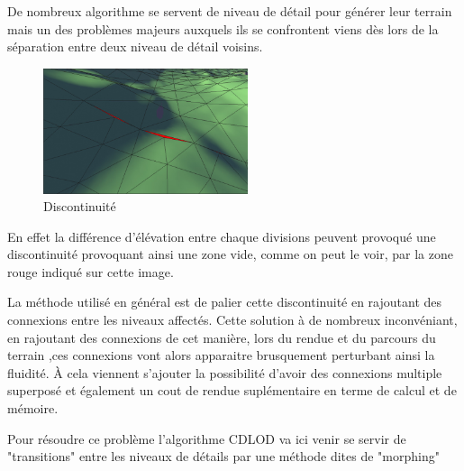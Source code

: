 \documentclass[12pt]{report}
\begin{document}
De nombreux algorithme se servent de niveau de détail pour générer leur terrain mais un des problèmes majeurs auxquels ils se confrontent viens dès lors de la séparation entre deux niveau de détail voisins. 
\begin{figure}
\includegraphics[width=6cm]{img/seams.png}
  \caption{Discontinuité}
  \label{fig:seams}
\end{figure}

\vspace{0.5cm}
En effet la différence d'élévation entre chaque divisions peuvent provoqué une discontinuité provoquant ainsi une zone vide, comme on peut le voir, par la zone rouge indiqué sur cette image. 


\vspace{3.2cm}
La méthode utilisé en général est de palier cette discontinuité en rajoutant des connexions entre les niveaux affectés. Cette solution à de nombreux inconvéniant, en rajoutant des connexions de cet manière, lors du rendue et du parcours du terrain ,ces connexions vont alors apparaitre brusquement perturbant ainsi la fluidité. À cela viennent s'ajouter la possibilité d'avoir des connexions multiple superposé et également un cout de rendue suplémentaire en terme de calcul et de mémoire.

Pour résoudre ce problème l'algorithme CDLOD va ici venir se servir de "transitions" entre les niveaux de détails par une méthode dites de "morphing"
\end{document}
